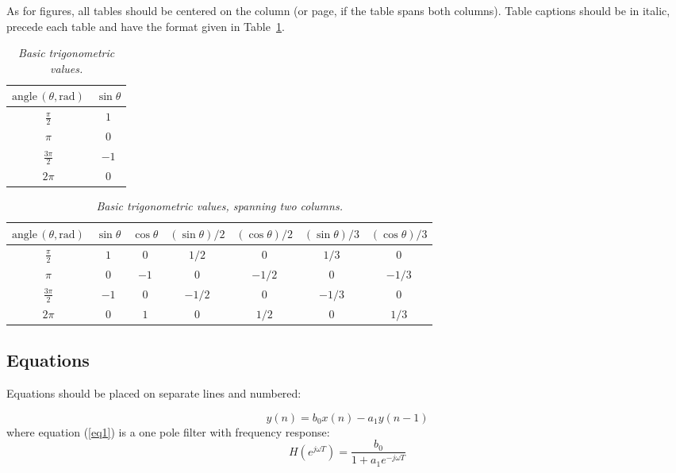 \documentclass[a4paper]{article}
\begin{document}
As for figures, all tables should be centered on the column (or page, if the
table spans both columns). Table captions should be in italic, precede each
table and have the format given in Table~\ref{tab:example}.

\begin{table}[ht]
  \caption{\itshape Basic trigonometric values.}
	\centering
	\begin{tabular}{|c|c|}
		\hline
		$\mathrm{angle}\,(\theta, \mathrm{rad})$ & $\sin \theta$ \\\hline
		$\frac{\pi}{2}$ & $1$ \\
		$\pi$ & $0$ \\
		$\frac{3\pi}{2}$ & $-1$ \\
		$2\pi$ & $0$ \\\hline
	\end{tabular}
	\label{tab:example}
\end{table}

\begin{table}[ht]
  \caption{{\it Basic trigonometric values, spanning two columns.}}
	\centering
  \begin{tabular}{|c|c|c|c|c|c|c|}\hline
    $\mathrm{angle}\, (\theta, \mathrm{rad})$ & $\sin \theta$ & $\cos \theta $ & $(\sin \theta)/2 $ & $(\cos \theta) /2 $ & $(\sin \theta)/3 $ & $(\cos \theta)/3$    \\\hline
    $\frac{\pi}{2}$ & $1$ & $0$ & $1/2$ & $0$ & $1/3$ & $0$ \\
    $\pi$ & $0$ & $-1$ & $0$ & $-1/2$ & $0$ & $-1/3$\\
    $\frac{3\pi}{2}$ & $-1$ & $0$ & $-1/2$ & $0$ & $-1/3$ & $0$ \\
    $2\pi$ & $0$ & $1$ & $0$ & $1/2$ & $0$ & $1/3$ \\\hline
 \end{tabular}
  \label{tab:example2}
\end{table}

\subsection{Equations}

Equations should be placed on separate lines and numbered:

\begin{equation}
	y(n)=b_0x(n)-a_1y(n-1)
	\label{eq1}
	\end{equation}
	where equation (\ref{eq1}) is a one pole filter with frequency response:
	\begin{equation}
	H(e^{j \omega T}) = \frac{b_0}{1+a_1e^{-j \omega T}}
	\label{eq2}
\end{equation}
\end{document}
